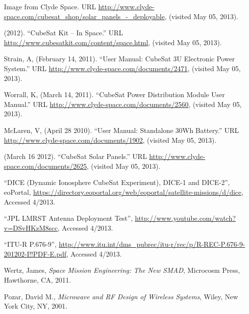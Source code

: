 \documentclass[12pt]{article}
\begin{document}
\begin{thebibliography}{9}








Image from Clyde Space.  URL \url{http://www.clyde-space.com/cubesat_shop/solar_panels_-_deployable}, (visited May 05, 2013).

 (2012).  ``CubeSat Kit -- In Space.''  URL \url{http://www.cubesatkit.com/content/space.html}, (visited May 05, 2013).

 Strain, A, (February 14, 2011).  ``User Manual: CubeSat 3U Electronic Power System.'' URL \url{http://www.clyde-space.com/documents/2471}, (visited May 05, 2013).

 Worrall, K, (March 14, 2011).  ``CubeSat Power Distribution Module User Manual.'' URL \url{http://www.clyde-space.com/documents/2560}, (visited May 05, 2013).

 McLaren, V, (April 28 2010).  ``User Manual: Standalone 30Wh Battery.''  URL \url{http://www.clyde-space.com/documents/1902}, (visited May 05, 2013).

 (March 16 2012). ``CubeSat Solar Panels.''  URL \url{http://www.clyde-space.com/documents/2625}, (visited May 05, 2013).


``DICE (Dynamic Ionosphere CubeSat Experiment), DICE-1 and DICE-2'', eoPortal, \url{https://directory.eoportal.org/web/eoportal/satellite-missions/d/dice}, Accessed 4/2013.

``JPL LMRST Antenna Deployment Test'', \url{http://www.youtube.com/watch?v=DSvHKzM8scc}, Accessed 4/2013.

``ITU-R P.676-9'', \url{http://www.itu.int/dms_pubrec/itu-r/rec/p/R-REC-P.676-9-201202-I!!PDF-E.pdf}, Accessed 4/2013.

Wertz, James, \emph{Space Mission Engineering: The New SMAD}, Microcosm Press, Hawthorne, CA, 2011.

Pozar, David M., \emph{Microwave and RF Design of Wireless Systems}, Wiley, New York City, NY, 2001.


\end{thebibliography}
\end{document}
